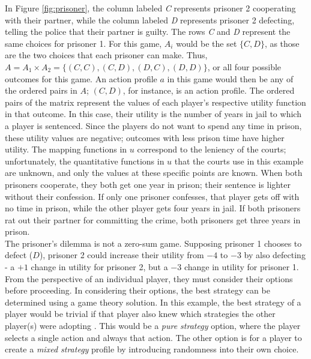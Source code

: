 In Figure \ref{fig:prisoner}, the column labeled \textit{C} represents prisoner 2 cooperating with their partner, while the column labeled \textit{D} represents prisoner 2 defecting, telling the police that their partner is guilty. The rows \textit{C} and \textit{D} represent the same choices for prisoner 1. For this game, $A_i$ would be the set $\{C, D\}$, as those are the two choices that each prisoner can make. Thus, $A=A_1\times A_2 = \{(C, C), (C, D), (D, C), (D, D)\}$, or all four possible outcomes for this game. An action profile $a$ in this game would then be any of the ordered pairs in $A$; $(C,D)$, for instance, is an action profile. The ordered pairs of the matrix represent the values of each player's respective utility function in that outcome. In this case, their utility is the number of years in jail to which a player is sentenced. Since the players do not want to spend any time in prison, these utility values are negative; outcomes with less prison time have higher utility. The mapping functions in $u$ correspond to the leniency of the courts; unfortunately, the quantitative functions in $u$ that the courts use in this example are unknown, and only the values at these specific points are known. When both prisoners cooperate, they both get one year in prison; their sentence is lighter without their confession. If only one prisoner confesses, that player gets off with no time in prison, while the other player gets four years in jail. If both prisoners rat out their partner for committing the crime, both prisoners get three years in prison.\\

The prisoner's dilemma is not a zero-sum game. Supposing prisoner 1 chooses to defect ($D$), prisoner 2 could increase their utility from $-4$ to $-3$ by also defecting - a $+1$ change in utility for prisoner 2, but a $-3$ change in utility for prisoner 1.\\

From the perspective of an individual player, they must consider their options before proceeding. In considering their options, the best strategy can be determined using a game theory solution. In this example, the best strategy of a player would be trivial if that player also knew which strategies the other player(s) were adopting \cite{shoh09}. This would be a \textit{pure strategy} option, where the player selects a single action and always that action. The other option is for a player to create a \textit{mixed strategy} profile by introducing randomness into their own choice.

